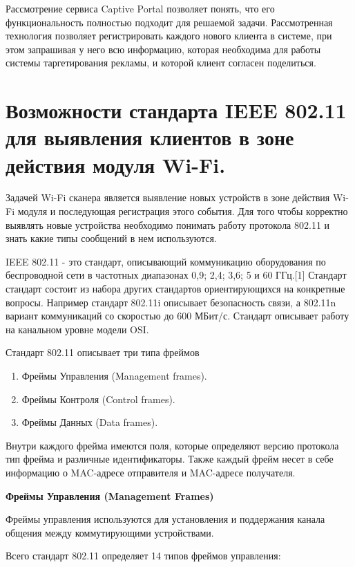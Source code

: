 Рассмотрение сервиса Captive Portal позволяет понять, что его функциональность полностью подходит для решаемой задачи. Рассмотренная технология позволяет регистрировать каждого нового клиента в системе, при этом запрашивая у него всю информацию, которая необходима для работы системы таргетирования рекламы, и которой клиент согласен поделиться.


\section{Возможности стандарта IEEE 802.11 для выявления клиентов в зоне действия модуля Wi-Fi.}

Задачей Wi-Fi сканера является выявление новых устройств в зоне действия Wi-Fi модуля и последующая регистрация этого события. Для того чтобы корректно выявлять новые устройства необходимо понимать работу протокола 802.11 и знать какие типы сообщений в нем используются.

IEEE 802.11 - это стандарт, описывающий коммуникацию оборудования по беспроводной сети в частотных диапазонах 0,9; 2,4; 3,6; 5 и 60 ГГц.[1] Стандарт стандарт состоит из набора других стандартов ориентирующихся на конкретные вопросы. Например стандарт 802.11i описывает безопасность связи, а 802.11n вариант коммуникаций со скоростью до 600 МБит/с. Стандарт описывает работу на канальном уровне модели OSI.

Стандарт 802.11 описывает три типа фреймов

\begin{enumerate}
	\item Фреймы Управления (Management frames).
	\item Фреймы Контроля (Control frames).
	\item Фреймы Данных (Data frames).
\end{enumerate}

Внутри каждого фрейма имеются поля, которые определяют версию протокола тип фрейма и различные идентификаторы. Также каждый фрейм несет в себе информацию о MAC-адресе отправителя и MAC-адресе получателя.

\textbf{Фреймы Управления (Management Frames)}

Фреймы управления используются для установления и поддержания канала общения между коммутирующими устройствами.

Всего стандарт 802.11 определяет 14 типов фреймов управления:

